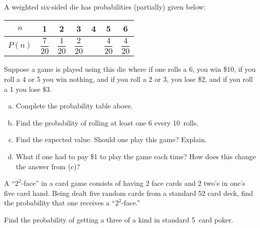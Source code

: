 \documentclass[11pt,letterpaper]{article}
\begin{document}
 A weighted six-sided die has probabilities (partially) given below: \par
	\begin{table}[!ht]
	\centering
	\begin{tabular}{|c||c|c|c|c|c|c|} \hline
	$n$ & 1 & 2 & 3 & 4 & 5 & 6 \\ \hline
	$P(n)$ & $\dfrac{7}{20}$ & $\dfrac{1}{20}$ & $\dfrac{2}{20}$ & & $\dfrac{4}{20}$ & $\dfrac{4}{20}$ \\ \hline
	\end{tabular}
	\end{table} \par
Suppose a game is played using this die where if one rolls a 6, you win \$10, if you roll a 4 or 5 you win nothing, and if you roll a 2 or 3, you lose \$2, and if you roll a 1 you lose \$3. 

\begin{enumerate}[(a)]
\item Complete the probability table above.
\item Find the probability of rolling at least one 6 every 10~rolls. 
\item Find the expected value. Should one play this game? Explain.
\item What if one had to pay \$1 to play the game each time? How does this change the answer from (c)? 
\end{enumerate}






\newpage





 A ``$2^2$-face'' in a card game consists of having 2 face cards and 2 two's in one's five card hand. Being dealt five random cards from a standard 52 card deck, find the probability that one receives a ``$2^2$-face.'' 





\newpage





 Find the probability of getting a three of a kind in standard 5~card poker. \pspace
\end{document}
